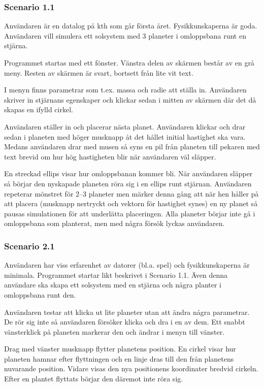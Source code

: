 \subsubsection{Scenario 1.1}

Användaren är en datalog på kth som går första året.
Fysikkunskaperna är goda.
Användaren vill simulera ett solsystem med 3 planeter
i omloppsbana runt en stjärna.

Programmet startas med ett fönster.
Vänstra delen av skärmen består av en grå meny.
Resten av skärmen är svart, bortsett
från lite vit text.

I menyn finns parametrar som t.ex. massa och radie att ställa in.
Användaren skriver in stjärnans egenskaper och klickar
sedan i mitten av skärmen där det då skapas en ifylld cirkel.

Användaren ställer in och placerar nästa planet.
Användaren klickar och drar sedan i planeten med
höger musknapp åt det hållet initial hastighet ska vara.
Medans användaren drar med musen så syns en pil från planeten till
pekaren med text brevid om hur hög hastigheten blir när användaren väl släpper.

En streckad ellips visar hur omloppsbanan kommer bli.
När användaren släpper så börjar den nyskapade planeten röra sig
i en ellips runt stjärnan.
Användaren repeterar mönstret för 2--3 planeter men märker denna gång
att när hen håller på att placera (musknapp nertryckt och vektorn
för hastighet synes) en ny planet så pausas simulationen för att
underlätta placeringen.
Alla planeter börjar inte gå i omloppsbana som planterat,
men med några försök lyckas användaren.

\subsubsection{Scenario 2.1}

Användaren har viss erfarenhet av datorer (bl.a. spel) och
fysikkunskaperna är minimala.
Programmet startar likt beskrivet i Scenario 1.1.
Även denna användare ska skapa ett solsystem med en stjärna
och några planter i omloppsbana runt den.

Användaren testar att klicka ut lite planeter utan att ändra några parametrar.
De rör sig inte så användaren försöker klicka och dra i en av dem.
Ett snabbt vänsterklick på planeten markerar den och ändrar i menyn
till vänster.

Drag med vänster musknapp flytter planetens position.
En cirkel visar hur planeten hamnar efter flyttningen och en linje dras
till den från planetens nuvarande position.
Vidare visas den nya positionens koordinater bredvid cirkeln.
Efter en plantet flyttats börjar den däremot inte röra sig.

